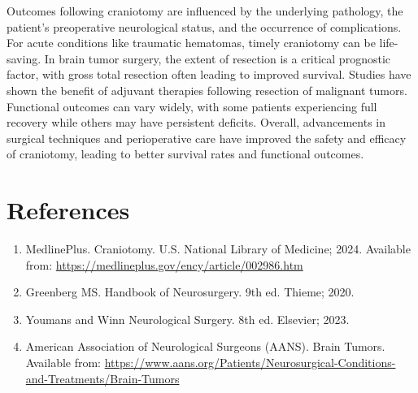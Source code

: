 Outcomes following craniotomy are influenced by the underlying pathology, the patient's preoperative neurological status, and the occurrence of complications. For acute conditions like traumatic hematomas, timely craniotomy can be life-saving. In brain tumor surgery, the extent of resection is a critical prognostic factor, with gross total resection often leading to improved survival. Studies have shown the benefit of adjuvant therapies following resection of malignant tumors. Functional outcomes can vary widely, with some patients experiencing full recovery while others may have persistent deficits. Overall, advancements in surgical techniques and perioperative care have improved the safety and efficacy of craniotomy, leading to better survival rates and functional outcomes.

\section*{References}
\begin{enumerate}
  \item MedlinePlus. Craniotomy. U.S. National Library of Medicine; 2024. Available from: \url{https://medlineplus.gov/ency/article/002986.htm}
  
  \item Greenberg MS. Handbook of Neurosurgery. 9th ed. Thieme; 2020.
  
  \item Youmans and Winn Neurological Surgery. 8th ed. Elsevier; 2023.
  
  \item American Association of Neurological Surgeons (AANS). Brain Tumors. Available from: \url{https://www.aans.org/Patients/Neurosurgical-Conditions-and-Treatments/Brain-Tumors}
\end{enumerate}

\clearpage
